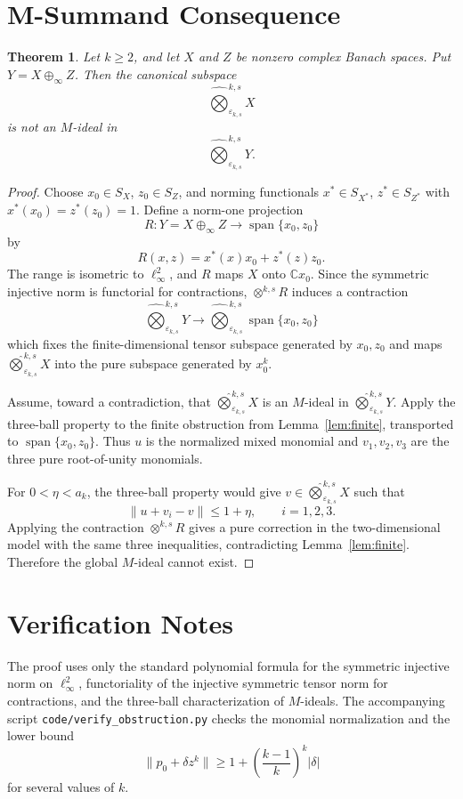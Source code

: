 \documentclass[11pt]{article}
\newtheorem{theorem}{Theorem}
\newcommand{\C}{\mathbb C}
\newcommand{\symten}[2]{\widehat{\bigotimes}^{#1,s}_{#2}}
\begin{document}
\section*{M-Summand Consequence}

\begin{theorem}
\label{thm:msummand}
Let \(k\ge2\), and let \(X\) and \(Z\) be nonzero complex Banach spaces. Put
\(Y=X\oplus_\infty Z\). Then the canonical subspace
\[
  \symten{k}{\varepsilon_{k,s}}X
\]
is not an \(M\)-ideal in
\[
  \symten{k}{\varepsilon_{k,s}}Y .
\]
\end{theorem}

\begin{proof}
Choose \(x_0\in S_X\), \(z_0\in S_Z\), and norming functionals
\(x^*\in S_{X^*}\), \(z^*\in S_{Z^*}\) with
\(x^*(x_0)=z^*(z_0)=1\). Define a norm-one projection
\[
  R:Y=X\oplus_\infty Z\longrightarrow \operatorname{span}\{x_0,z_0\}
\]
by
\[
  R(x,z)=x^*(x)x_0+z^*(z)z_0 .
\]
The range is isometric to \(\ell_\infty^2\), and \(R\) maps \(X\) onto
\(\C x_0\). Since the symmetric injective norm is functorial for contractions,
\(\otimes^{k,s}R\) induces a contraction
\[
  \symten{k}{\varepsilon_{k,s}}Y
  \longrightarrow
  \symten{k}{\varepsilon_{k,s}}\operatorname{span}\{x_0,z_0\}
\]
which fixes the finite-dimensional tensor subspace generated by \(x_0,z_0\)
and maps \(\symten{k}{\varepsilon_{k,s}}X\) into the pure subspace generated
by \(x_0^k\).

Assume, toward a contradiction, that
\(\symten{k}{\varepsilon_{k,s}}X\) is an \(M\)-ideal in
\(\symten{k}{\varepsilon_{k,s}}Y\). Apply the three-ball property to the
finite obstruction from Lemma~\ref{lem:finite}, transported to
\(\operatorname{span}\{x_0,z_0\}\). Thus \(u\) is the normalized mixed monomial
and \(v_1,v_2,v_3\) are the three pure root-of-unity monomials.

For \(0<\eta<a_k\), the three-ball property would give
\(v\in \symten{k}{\varepsilon_{k,s}}X\) such that
\[
  \|u+v_i-v\|\le 1+\eta,\qquad i=1,2,3.
\]
Applying the contraction \(\otimes^{k,s}R\) gives a pure correction in the
two-dimensional model with the same three inequalities, contradicting
Lemma~\ref{lem:finite}. Therefore the global \(M\)-ideal cannot exist.
\end{proof}

\section*{Verification Notes}

The proof uses only the standard polynomial formula for the symmetric
injective norm on \(\ell_\infty^2\), functoriality of the injective symmetric
tensor norm for contractions, and the three-ball characterization of
\(M\)-ideals. The accompanying script
\texttt{code/verify\_obstruction.py} checks the
monomial normalization and the lower bound
\[
  \|p_0+\delta z^k\|\ge 1+\left(\frac{k-1}{k}\right)^k|\delta|
\]
for several values of \(k\).
\end{document}
